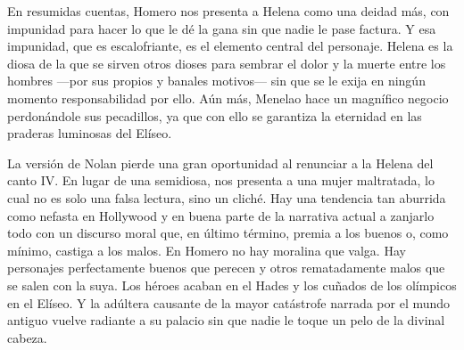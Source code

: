 En resumidas cuentas, Homero nos presenta a Helena como una deidad más, con impunidad para hacer lo que le dé la gana sin que nadie le pase factura. Y esa impunidad, que es escalofriante, es el elemento central del personaje. Helena es la diosa de la que se sirven otros dioses para sembrar el dolor y la muerte entre los hombres ---por sus propios y banales motivos--- sin que se le exija en ningún momento responsabilidad por ello. Aún más, Menelao hace un magnífico negocio perdonándole sus pecadillos, ya que con ello se garantiza la eternidad en las praderas luminosas del Elíseo.

La versión de Nolan pierde una gran oportunidad al renunciar a la Helena del canto IV. En lugar de una semidiosa, nos presenta a una mujer maltratada, lo cual no es solo una falsa lectura, sino un cliché.
Hay una tendencia tan aburrida como nefasta en Hollywood y en buena parte de la narrativa actual a zanjarlo todo con un discurso moral que, en último término, premia a los buenos o, como mínimo, castiga a los malos. En Homero no hay moralina que valga. Hay personajes perfectamente buenos que perecen y otros rematadamente malos que se salen con la suya. Los héroes acaban en el Hades y los cuñados de los olímpicos en el Elíseo. Y la adúltera causante de la mayor catástrofe narrada por el mundo antiguo vuelve radiante a su palacio sin que nadie le toque un pelo de la divinal cabeza.
